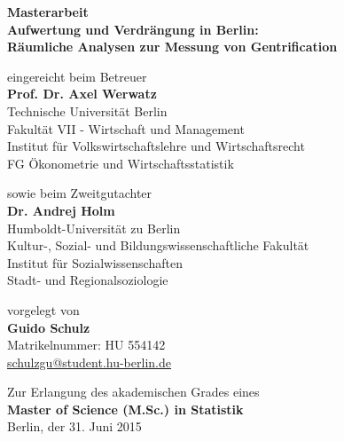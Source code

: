 \begin{center}
    {\normalsize{\bf Masterarbeit}} \\\vspace{0.5cm}
    {\large{\bf Aufwertung und Verdrängung in Berlin: \\
                Räumliche Analysen zur Messung von Gentrification}} \vspace{1.0cm}

    {\normalsize eingereicht beim Betreuer}\\\vspace{0.5cm}
    {\normalsize{\bf Prof. Dr. Axel Werwatz}} \\\vspace{0.5cm}
    {\normalsize Technische Universität Berlin \\
    Fakultät VII - Wirtschaft und Management \\
    Institut für Volkswirtschaftslehre und Wirtschaftsrecht \\
    FG Ökonometrie und Wirtschaftsstatistik} \vspace{1cm}

    {\normalsize sowie beim Zweitgutachter}\\\vspace{0.5cm}
    {\normalsize{\bf Dr. Andrej Holm}} \\\vspace{0.5cm}
    {\normalsize Humboldt-Universität zu Berlin \\
    Kultur-, Sozial- und Bildungswissenschaftliche Fakultät\\
    Institut für Sozialwissenschaften\\
    Stadt- und Regionalsoziologie} \vspace{1cm}

    {\normalsize vorgelegt von \\\vspace{0.5cm}
    {\bf Guido Schulz} \\
    Matrikelnummer: HU 554142 \\
    \href{mailto:schulzgu@student.hu-berlin.de}{schulzgu@student.hu-berlin.de}} \vspace{1cm}


    {\normalsize Zur Erlangung des akademischen Grades eines \\
    {\bf Master of Science (M.Sc.) in Statistik} \\
    Berlin, der 31. Juni 2015}

\end{center}
